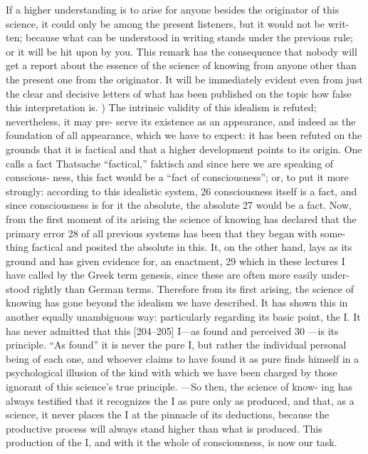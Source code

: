 If a higher understanding is to arise for anyone besides the originator of this
science, it could only be among the present listeners, but it would not be writ-
ten; because what can be understood in writing stands under the previous rule;
or it will be hit upon by you.
This remark has the consequence that nobody will
get a report about the essence of the science of knowing from anyone other
than the present one from the originator.
It will be immediately evident even
from just the clear and decisive letters of what has been published on the topic
how false this interpretation is.
)
The intrinsic validity of this idealism is refuted; nevertheless, it may pre-
serve its existence as an appearance, and indeed as the foundation of all
appearance, which we have to expect: it has been refuted on the grounds that
it is factical and that a higher development points to its origin.
One calls a fact
{Thatsache} “factical,” {faktisch} and since here we are speaking of conscious-
ness, this fact would be a “fact of consciousness”; or, to put it more strongly:
according to this idealistic system, 26 consciousness itself is a fact, and since
consciousness is for it the absolute, the absolute 27 would be a fact.
Now, from
the first moment of its arising the science of knowing has declared that the
primary error 28 of all previous systems has been that they began with some-
thing factical and posited the absolute in this.
It, on the other hand, lays as its
ground and has given evidence for, an enactment, 29 which in these lectures I
have called by the Greek term genesis, since these are often more easily under-
stood rightly than German terms.
Therefore from its first arising, the science
of knowing has gone beyond the idealism we have described.
It has shown this
in another equally unambiguous way: particularly regarding its basic point, the
I.
It has never admitted that this [204–205] I—as found and perceived 30 —is its
principle.
“As found” it is never the pure I, but rather the individual personal
being of each one, and whoever claims to have found it as pure finds himself
in a psychological illusion of the kind with which we have been charged by
those ignorant of this science’s true principle.
—So then, the science of know-
ing has always testified that it recognizes the I as pure only as produced, and
that, as a science, it never places the I at the pinnacle of its deductions, because
the productive process will always stand higher than what is produced.
This
production of the I, and with it the whole of consciousness, is now our task.

